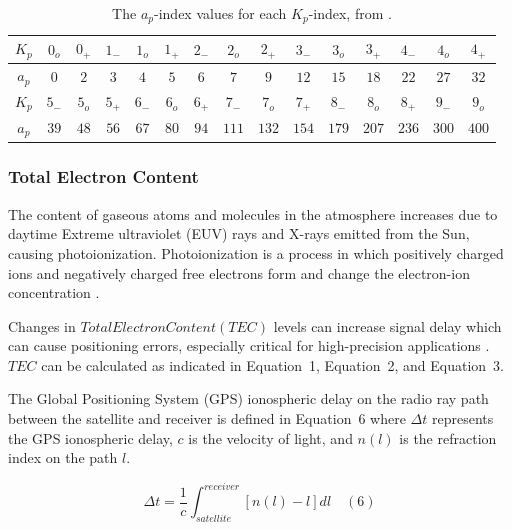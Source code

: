\documentclass[sn-mathphys-num]{sn-jnl}%
\begin{document}
\begin{table}[!ht]
    \centering
    \caption{The $a_{p}$-index values for each $K_{p}$-index, from \cite{NOAA2024gGeomagneticIndices}.}
    \label{tab:ap}
    \begin{tabular}{|c|c|c|c|c|c|c|c|c|c|c|c|c|c|c|}
        \hline
        $K_{p}$ & $0_{o}$ & $0_{+}$ & $1_{-}$ & $1_{o}$ & $1_{+}$ & $2_{-}$ & $2_{o}$ & $2_{+}$ & $3_{-}$ & $3_{o}$ & $3_{+}$ & $4_{-}$ & $4_{o}$ & $4_{+}$ \\ \hline
        $a_{p}$ & $0$ & $2$ & $3$ & $4$ & $5$ & $6$ & $7$ & $9$ & $12$ & $15$ & $18$ & $22$ & $27$ & $32$ \\ \hline
        $K_{p}$ & $5_{-}$ & $5_{o}$ & $5_{+}$ & $6_{-}$ & $6_{o}$ & $6_{+}$ & $7_{-}$ & $7_{o}$ & $7_{+}$ & $8_{-}$ & $8_{o}$ & $8_{+}$ & $9_{-}$ & $9_{o}$ \\ \hline
        $a_{p}$ & $39$ & $48$ & $56$ & $67$ & $80$ & $94$ & $111$ & $132$ & $154$ & $179$ & $207$ & $236$ & $300$ & $400$ \\ \hline
 \end{tabular}
\end{table}

\subsubsection{Total Electron Content}

The content of gaseous atoms and molecules in the atmosphere increases due to daytime Extreme ultraviolet (EUV) rays and X-rays emitted from the Sun, causing photoionization. Photoionization is a process in which positively charged ions and negatively charged free electrons form and change the electron-ion concentration \cite{prolss2012physics}.

Changes in $Total Electron Content (TEC)$ levels \cite{liu2009seismoionospheric} can increase signal delay which can cause positioning errors, especially critical for high-precision applications \cite{durmaz2015regional, jin2012m_dcb}. $TEC$ can be calculated as indicated in Equation~1, Equation~2, and Equation~3. 

The Global Positioning System (GPS) ionospheric delay \cite{schaer1999mapping} on the radio ray path between the satellite and receiver is defined in Equation~6 \cite{spilker1996global} where $\Delta t$ represents the GPS ionospheric delay, $c$ is the velocity of light, and $n(l)$ is the refraction index on the path $l$.

\begin{equation}
	\Delta t = \frac{1}{c} \int_{satellite}^{receiver} \left[ n(l) - l \right]dl
	\quad\left(6\right)
\end{equation}
\end{document}
